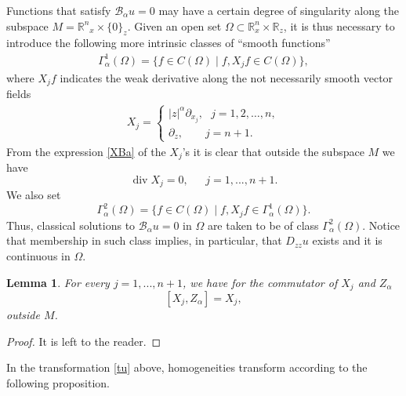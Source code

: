 \documentclass[11pt]{amsart}
\theoremstyle{plain}
\newtheorem{lemma}[thrm]{Lemma}
\numberwithin{equation}{section}
\begin{document}
Functions that satisfy ${\mathcal{B}_\alpha} u=0$ may have a certain degree of singularity along the subspace $M = {\mathbb R^n}_x\times\{0\}_z$. Given an open set ${\Omega} \subset {\mathbb R}^{n}_x\times {\mathbb R}_z$, it is thus necessary to introduce the following more intrinsic classes of ``smooth  functions''
\begin{align*}
 \Gamma^1_\alpha(\Omega)=\{f\in C(\Omega)\mid f,X_jf\in C(\Omega)\},
\end{align*}
where $X_j f$ indicates the weak derivative along the
not necessarily smooth vector fields
\begin{align}\label{XBa}
 X_j=\begin{cases}
 |z|^\alpha \partial_{x_{j}},\ \ \ j = 1, 2,\ldots,n,
 \\
{\partial}_z,\ \ \ \ \ \ \ \ \ j=n+1.
     \end{cases}
\end{align}
  From the expression \eqref{XBa} of the $X_j$'s it is clear that outside the subspace $M$ we have
\begin{equation}\label{div}
\operatorname{div} X_j = 0,\ \ \ \ \ \ \ j=1,...,n+1.
\end{equation}
We also set
\[
\Gamma^2_\alpha(\Omega)=\{f\in C(\Omega)\mid f,X_jf\in \Gamma^1_\alpha(\Omega)\}.
\]
Thus, classical solutions to ${\mathcal{B}_\alpha} u=0$ in $\Omega$ are taken to be of class $\Gamma^2_\alpha(\Omega)$. Notice that membership in such class implies, in particular, that $D_{zz} u$ exists and it is continuous in ${\Omega}$.

\begin{lemma}\label{L:comm}
For every $j=1,...,n+1$, we have for the commutator of $X_j$ and $Z_\alpha$
\[
[X_j,Z_\alpha] = X_j,
\]
outside $M$.
\end{lemma}

\begin{proof}
It is left to the reader.

\end{proof}

In the transformation \eqref{tu} above, homogeneities transform according to the following proposition.
\end{document}

